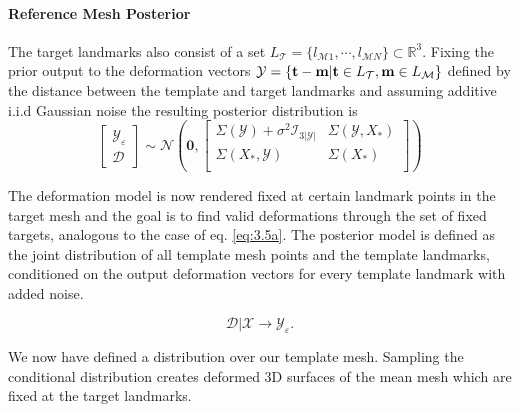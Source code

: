 \paragraph{Reference Mesh Posterior}
The target landmarks also consist of a set $L_{\mathcal{T}} = \{l_{\mathcal{M}1},\cdots, l_{\mathcal{M}N}\} \subset \mathbb{R}^3$. 
Fixing the prior output to the deformation vectors $\mathcal{Y}=\{\textbf{t}-\textbf{m}\vert \textbf{t} \in L_{\mathcal{T}}, \textbf{m} \in L_{\mathcal{M}}\}$ defined by the distance between the template and target landmarks and assuming additive i.i.d Gaussian noise the resulting posterior distribution is
\begin{equation}
    \begin{bmatrix}\mathcal{Y_{\varepsilon}}\\\mathcal{D}\end{bmatrix}
\sim \mathcal{N}\left(\textbf{0},
\begin{bmatrix}
    \Sigma(\mathcal{Y}) + \sigma^2\mathcal{I}_{3\left|\mathcal{Y} \right|} & \Sigma(\mathcal{Y},X_{*})\\
    \Sigma(X_{*},\mathcal{Y}) & \Sigma(X_{*})\\
\end{bmatrix}
\right)
\end{equation}

The deformation model is now rendered fixed at certain landmark points in the target mesh and the goal is to find valid deformations through the set of fixed targets, analogous to the case of eq. \ref{eq:3.5a}. The posterior model is defined as the joint distribution of all template mesh points and the template landmarks, conditioned on the output deformation vectors for every template landmark with added noise.
\begin{center}
\begin{equation}
    \mathcal{D}\vert \mathcal{X} \rightarrow \mathcal{Y}_{\varepsilon}. 
\end{equation}
\end{center}
We now have defined a distribution over our template mesh.  Sampling the conditional distribution creates deformed 3D surfaces of the mean mesh which are fixed at the target landmarks.

